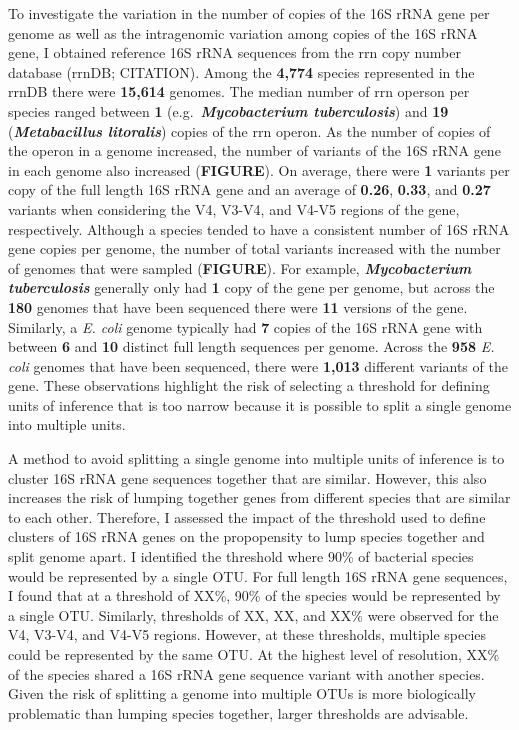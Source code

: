 \documentclass[
]{article}
\begin{document}
To investigate the variation in the number of copies of the 16S rRNA
gene per genome as well as the intragenomic variation among copies of
the 16S rRNA gene, I obtained reference 16S rRNA sequences from the rrn
copy number database (rrnDB; CITATION). Among the \textbf{4,774} species
represented in the rrnDB there were \textbf{15,614} genomes. The median
number of rrn operson per species ranged between \textbf{1}
(e.g.~\textbf{\emph{Mycobacterium tuberculosis}}) and \textbf{19}
(\textbf{\emph{Metabacillus litoralis}}) copies of the rrn operon. As
the number of copies of the operon in a genome increased, the number of
variants of the 16S rRNA gene in each genome also increased
(\textbf{FIGURE}). On average, there were \textbf{1} variants per copy
of the full length 16S rRNA gene and an average of \textbf{0.26},
\textbf{0.33}, and \textbf{0.27} variants when considering the V4,
V3-V4, and V4-V5 regions of the gene, respectively. Although a species
tended to have a consistent number of 16S rRNA gene copies per genome,
the number of total variants increased with the number of genomes that
were sampled (\textbf{FIGURE}). For example, \textbf{\emph{Mycobacterium
tuberculosis}} generally only had \textbf{1} copy of the gene per
genome, but across the \textbf{180} genomes that have been sequenced
there were \textbf{11} versions of the gene. Similarly, a \emph{E. coli}
genome typically had \textbf{7} copies of the 16S rRNA gene with between
\textbf{6} and \textbf{10} distinct full length sequences per genome.
Across the \textbf{958} \emph{E. coli} genomes that have been sequenced,
there were \textbf{1,013} different variants of the gene. These
observations highlight the risk of selecting a threshold for defining
units of inference that is too narrow because it is possible to split a
single genome into multiple units.

A method to avoid splitting a single genome into multiple units of
inference is to cluster 16S rRNA gene sequences together that are
similar. However, this also increases the risk of lumping together genes
from different species that are similar to each other. Therefore, I
assessed the impact of the threshold used to define clusters of 16S rRNA
genes on the propopensity to lump species together and split genome
apart. I identified the threshold where 90\% of bacterial species would
be represented by a single OTU. For full length 16S rRNA gene sequences,
I found that at a threshold of XX\%, 90\% of the species would be
represented by a single OTU. Similarly, thresholds of XX, XX, and XX\%
were observed for the V4, V3-V4, and V4-V5 regions. However, at these
thresholds, multiple species could be represented by the same OTU. At
the highest level of resolution, XX\% of the species shared a 16S rRNA
gene sequence variant with another species. Given the risk of splitting
a genome into multiple OTUs is more biologically problematic than
lumping species together, larger thresholds are advisable.
\end{document}
